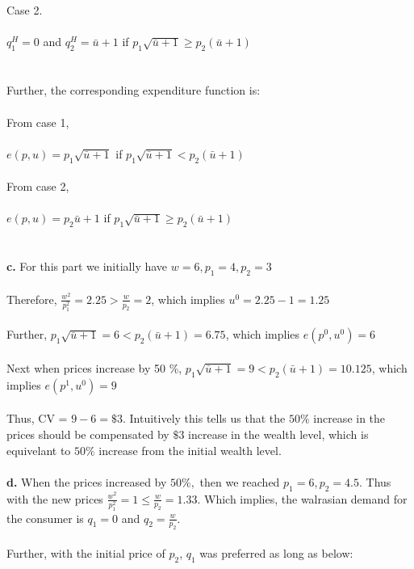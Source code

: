 \documentclass[12pt]{article}
\newenvironment{problem}[2][Problem]{\begin{trivlist}
\item[\hskip \labelsep {\bfseries #1}\hskip \labelsep {\bfseries #2.}]}{\end{trivlist}}
\newcommand\ddfrac[2]{\frac{\displaystyle #1}{\displaystyle #2}}
\begin{document}
\begin{problem}{4}
\\
\\
Case 2. 
\\
\\
$q_1^H = 0 $ and $q_2^H = \bar{u} +1  $ if $ p_1\sqrt{\bar{u} +1} \geq p_2 ( \bar{u} +1)$
\\
\\
\\
Further, the corresponding expenditure function is:
\\
\\
From case 1,
\\
\\
$e(p,u) = p_1\sqrt{\bar{u} +1} $ if $ p_1\sqrt{\bar{u} +1} < p_2 ( \bar{u} +1)$
\\
\\
From case 2,
\\
\\
$e(p,u) = p_2\bar{u} +1 $ if $ p_1\sqrt{\bar{u} +1} \geq p_2 ( \bar{u} +1)$
\\
\\
\\
\textbf{c.} For this part we initially have $w = 6, p_1 = 4, p_2 = 3$
\\
\\
Therefore, $\ddfrac{w^2}{p_1^2} = 2.25 > \ddfrac{w}{p_2} = 2 $, which implies $u^0 = 2.25 -1 = 1.25 $
\\
\\
Further, $ p_1\sqrt{\bar{u} +1} = 6 < p_2 ( \bar{u} +1) = 6.75 $, which implies $e(p^0, u^0) = 6$ 
\\
\\
Next when prices increase by 50 \%, $ p_1\sqrt{\bar{u} +1} = 9 < p_2 ( \bar{u} +1) = 10.125 $, which implies $e(p^1, u^0) = 9$ 
\\
\\
Thus, CV = $ 9 - 6 = \$ 3$. Intuitively this tells us that the $ 50 \% $ increase in the prices should be compensated by $ \$ 3 $ increase in the wealth level, which is equivelant to $  50\% $ increase from the initial wealth level. 
\\
\\
\textbf{d.}
When the prices increased by $ 50 \%, $ then we reached $ p_1 = 6, p_2 = 4.5$. Thus with the new prices $\ddfrac{w^2}{p_1^2} = 1 \leq \ddfrac{w}{p_2} = 1.33 $. Which implies, the walrasian demand for the consumer is $q_1 = 0 $ and $q_2 = \ddfrac{w}{p_2}  $. 
\\
\\
Further, with the initial price of $p_2 $, $q_1 $ was preferred as long as below:

\end{problem}
\end{document}
